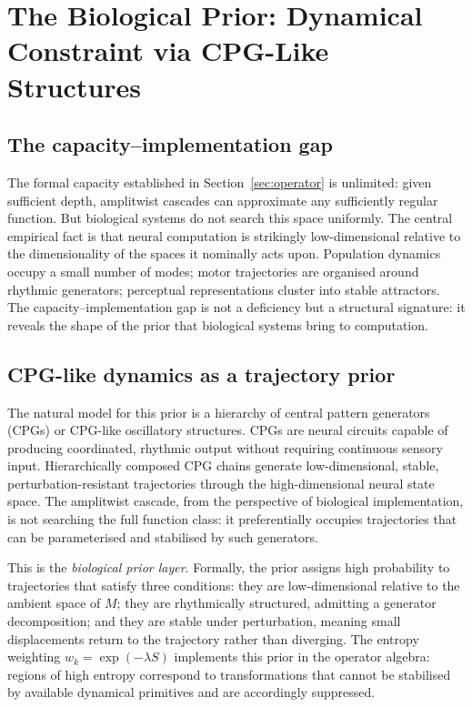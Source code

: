 \documentclass[12pt, a4paper]{article}
\theoremstyle{remark}
\theoremstyle{definition}
\begin{document}
\section{The Biological Prior: Dynamical Constraint via CPG-Like Structures}
\label{sec:prior}

\subsection{The capacity--implementation gap}

The formal capacity established in Section~\ref{sec:operator} is unlimited: given
sufficient depth, amplitwist cascades can approximate any sufficiently regular function.
But biological systems do not search this space uniformly.  The central empirical fact is
that neural computation is strikingly low-dimensional relative to the dimensionality of the
spaces it nominally acts upon.  Population dynamics occupy a small number of modes; motor
trajectories are organised around rhythmic generators; perceptual representations cluster
into stable attractors.  The capacity--implementation gap is not a deficiency but a
structural signature: it reveals the shape of the prior that biological systems bring to
computation.

\subsection{CPG-like dynamics as a trajectory prior}

The natural model for this prior is a hierarchy of central pattern generators (CPGs) or
CPG-like oscillatory structures.  CPGs are neural circuits capable of producing
coordinated, rhythmic output without requiring continuous sensory input.  Hierarchically
composed CPG chains generate low-dimensional, stable, perturbation-resistant trajectories
through the high-dimensional neural state space.  The amplitwist cascade, from the
perspective of biological implementation, is not searching the full function class: it
preferentially occupies trajectories that can be parameterised and stabilised by such
generators.

This is the \emph{biological prior layer}.  Formally, the prior assigns high probability
to trajectories that satisfy three conditions: they are low-dimensional relative to the
ambient space of $M$; they are rhythmically structured, admitting a generator
decomposition; and they are stable under perturbation, meaning small displacements return
to the trajectory rather than diverging.  The entropy weighting $w_k = \exp(-\lambda S)$
implements this prior in the operator algebra: regions of high entropy correspond to
transformations that cannot be stabilised by available dynamical primitives and are
accordingly suppressed.
\end{document}
